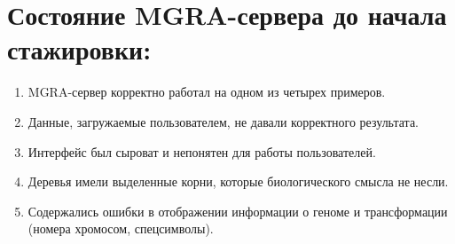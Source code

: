 \documentclass{article}
\begin{document}
\section{Состояние MGRA-сервера до начала стажировки:}
\begin{enumerate}
	\item MGRA-сервер корректно работал на одном из четырех примеров. 
	\item Данные, загружаемые пользователем, не давали корректного результата. 
	\item Интерфейс был сыроват и непонятен для работы пользователей. 
	\item Деревья имели выделенные корни, которые биологического смысла не несли. 
	\item Содержались ошибки в отображении информации о геноме и трансформации (номера хромосом, спецсимволы).
\end{enumerate}
 
\end{document}

